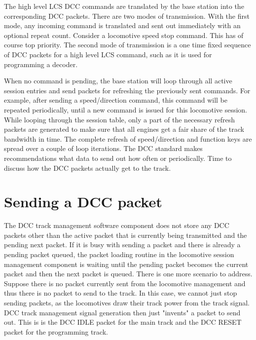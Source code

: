 \begin{center}
\end{center}

The high level LCS DCC commands are translated by the base station into the corresponding DCC packets. There are two modes of transmission. With the first mode, any incoming command is translated and sent out immediately with an optional repeat count. Consider a locomotive speed stop command. This has of course top priority. The second mode of transmission is a one time fixed sequence of DCC packets for a high level LCS command, such as it is used for programming a decoder.

When no command is pending, the base station will loop through all active session entries and send packets for refreshing the previously sent commands. For example, after sending a speed/direction command, this command will be repeated periodically, until a new command is issued for this locomotive session. While looping through the session table, only a part of the necessary refresh packets are generated to make sure that all engines get a fair share of the track bandwidth in time. The complete refresh of speed/direction and function keys are spread over a couple of loop iterations. The DCC standard makes recommendations what data to send out how often or periodically. Time to discuss how the DCC packets actually get to the track.

\section{Sending a DCC packet}

The DCC track management software component does not store any DCC packets other than the active packet that is currently being transmitted and the pending next packet. If it is busy with sending a packet and there is already a pending packet queued, the packet loading routine in the locomotive session management component is waiting until the pending packet becomes the current packet and then the next packet is queued. There is one more scenario to address. Suppose there is no packet currently sent from the locomotive management and thus there is no packet to send to the track. In this case, we cannot just stop sending packets, as the locomotives draw their track power from the track signal. DCC track management signal generation then just "invents" a packet to send out. This is is the DCC IDLE packet for the main track and the DCC RESET packet for the programming track.

